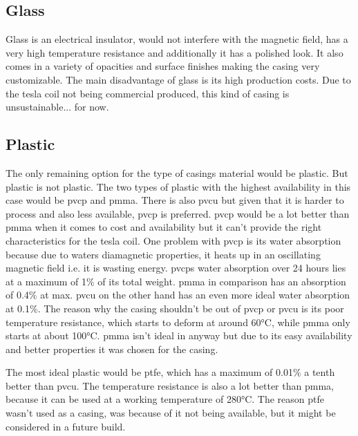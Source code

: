\subsection{Glass}

Glass is an electrical insulator, would not interfere with the magnetic field, has a very high temperature resistance and additionally it has a polished look. It also comes in a variety of opacities and surface finishes making the casing very customizable. The main disadvantage of glass is its high production costs. Due to the tesla coil not being commercial produced, this kind of casing is unsustainable... for now.

\subsection{Plastic}

The only remaining option for the type of casings material would be plastic. But plastic is not plastic. The two types of plastic with the highest availability in this case would be \gls{pvcp} and \gls{pmma}. There is also \gls{pvcu} but given that it is harder to process and also less available, \gls{pvcp} is preferred. \gls{pvcp} would be a lot better than \gls{pmma} when it comes to cost and availability but it can't provide the right characteristics for the tesla coil. One problem with \gls{pvcp} is its water absorption because due to waters diamagnetic properties, it heats up in an oscillating magnetic field i.e. it is wasting energy. \gls{pvcp}s water absorption over 24 hours lies at a maximum of 1\% of its total weight. \gls{pmma} in comparison has an absorption of 0.4\% at max. \gls{pvcu} on the other hand has an even more ideal water absorption at 0.1\%. The reason why the casing shouldn't be out of \gls{pvcp} or \gls{pvcu} is its poor temperature resistance, which starts to deform at around 60°C, while \gls{pmma} only starts at about 100°C. \gls{pmma} isn't ideal in anyway but due to its easy availability and better properties it was chosen for the casing. 

The most ideal plastic would be \gls{ptfe}, which has a maximum of 0.01\% a tenth better than \gls{pvcu}. The temperature resistance is also a lot better than \gls{pmma}, because it can be used at a working temperature of 280°C. The reason \gls{ptfe} wasn't used as a casing, was because of it not being available, but it might be considered in a future build. 

